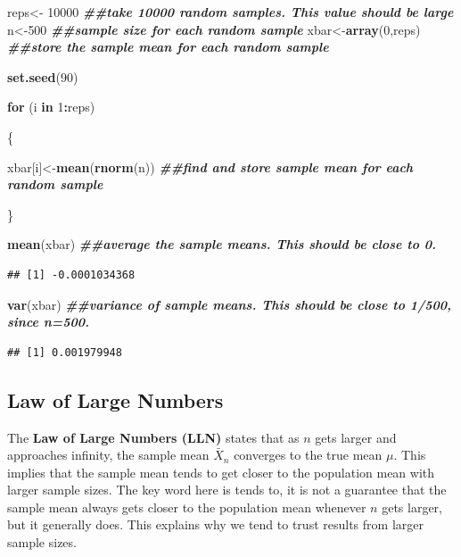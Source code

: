 \documentclass[
]{book}
\newenvironment{Shaded}{\begin{snugshade}}{\end{snugshade}}
\newcommand{\ControlFlowTok}[1]{\textcolor[rgb]{0.13,0.29,0.53}{\textbf{#1}}}
\newcommand{\DecValTok}[1]{\textcolor[rgb]{0.00,0.00,0.81}{#1}}
\newcommand{\DocumentationTok}[1]{\textcolor[rgb]{0.56,0.35,0.01}{\textbf{\textit{#1}}}}
\newcommand{\FunctionTok}[1]{\textcolor[rgb]{0.13,0.29,0.53}{\textbf{#1}}}
\newcommand{\NormalTok}[1]{#1}
\newcommand{\OtherTok}[1]{\textcolor[rgb]{0.56,0.35,0.01}{#1}}
\newcommand{\SpecialCharTok}[1]{\textcolor[rgb]{0.81,0.36,0.00}{\textbf{#1}}}
\begin{document}
\begin{Shaded}
\begin{Highlighting}[]
\NormalTok{reps}\OtherTok{\textless{}{-}} \DecValTok{10000} \DocumentationTok{\#\#take 10000 random samples. This value should be large}
\NormalTok{n}\OtherTok{\textless{}{-}}\DecValTok{500} \DocumentationTok{\#\#sample size for each random sample}
\NormalTok{xbar}\OtherTok{\textless{}{-}}\FunctionTok{array}\NormalTok{(}\DecValTok{0}\NormalTok{,reps) }\DocumentationTok{\#\#store the sample mean for each random sample}

\FunctionTok{set.seed}\NormalTok{(}\DecValTok{90}\NormalTok{)}

\ControlFlowTok{for}\NormalTok{ (i }\ControlFlowTok{in} \DecValTok{1}\SpecialCharTok{:}\NormalTok{reps)}
  
\NormalTok{\{}
  
\NormalTok{  xbar[i]}\OtherTok{\textless{}{-}}\FunctionTok{mean}\NormalTok{(}\FunctionTok{rnorm}\NormalTok{(n)) }\DocumentationTok{\#\#find and store sample mean for each random sample}
  
\NormalTok{\}}

\FunctionTok{mean}\NormalTok{(xbar) }\DocumentationTok{\#\#average the sample means. This should be close to 0. }
\end{Highlighting}
\end{Shaded}

\begin{verbatim}
## [1] -0.0001034368
\end{verbatim}

\begin{Shaded}
\begin{Highlighting}[]
\FunctionTok{var}\NormalTok{(xbar) }\DocumentationTok{\#\#variance of sample means. This should be close to 1/500, since n=500. }
\end{Highlighting}
\end{Shaded}

\begin{verbatim}
## [1] 0.001979948
\end{verbatim}

\subsection{Law of Large Numbers}\label{law-of-large-numbers}

The \textbf{Law of Large Numbers (LLN)} states that as \(n\) gets larger and approaches infinity, the sample mean \(\bar{X}_n\) converges to the true mean \(\mu\). This implies that the sample mean tends to get closer to the population mean with larger sample sizes. The key word here is tends to, it is not a guarantee that the sample mean always gets closer to the population mean whenever \(n\) gets larger, but it generally does. This explains why we tend to trust results from larger sample sizes.
\end{document}
